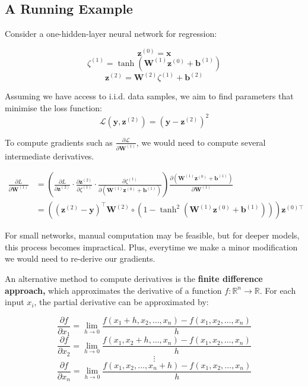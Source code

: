 \subsection{A Running Example}

Consider a one-hidden-layer neural network for regression:

\[
    \bm{z}^{(0)} = \bm{x}
\]
\[
    \zeta^{(1)} = \tanh\left( \bm{W}^{(1)} \bm{z}^{(0)} + \bm{b}^{(1)} \right)
\]
\[
    \bm{z}^{(2)} = \bm{W}^{(2)} \zeta^{(1)} + \bm{b}^{(2)}
\]

Assuming we have access to i.i.d. data samples, we aim to find parameters that minimise the loss function:
\[
    \mathcal{L}(\bm{y}, \bm{z}^{(2)}) = \left( \bm{y} - \bm{z}^{(2)} \right)^2
\]

To compute gradients such as \( \frac{\partial \mathcal{L}}{\partial \bm{W}^{(1)}} \), we would need to compute several intermediate derivatives.

\[\begin{aligned}
        \frac{\partial L}{\partial\boldsymbol{W}^{(1)}} & =\left(\frac{\partial L}{\partial\boldsymbol{z}^{(2)}}\cdot\frac{\partial\boldsymbol{z}^{(2)}}{\partial\zeta^{(1)}}\cdot\frac{\partial\zeta^{(1)}}{\partial(\boldsymbol{W}^{(1)}\boldsymbol{z}^{(0)}+\boldsymbol{b}^{(1)})}\right)\frac{\partial(\boldsymbol{W}^{(1)}\boldsymbol{z}^{(0)}+\boldsymbol{b}^{(1)})}{\partial\boldsymbol{W}^{(1)}} \\
                                                        & =\left((\boldsymbol{z}^{(2)}-\boldsymbol{y})^\top\boldsymbol{W}^{(2)}\circ\left(1-\tanh^2(\boldsymbol{W}^{(1)}\boldsymbol{z}^{(0)}+\boldsymbol{b}^{(1)})\right)\right)\boldsymbol{z}^{(0)\top}
    \end{aligned}\]

For small networks, manual computation may be feasible, but for deeper models, this process becomes impractical. Plus, everytime we make a minor modification we would need to re-derive our gradients. \bigskip

An alternative method to compute derivatives is the\textbf{ finite difference approach,} which approximates the derivative of a function \( f : \mathbb{R}^n \to \mathbb{R} \). For each input \( x_i \), the partial derivative can be approximated by:

\[
    \frac{\partial f}{\partial x_1} = \lim_{h \to 0} \frac{f(x_1 + h, x_2, \dots, x_n) - f(x_1, x_2, \dots, x_n)}{h}
\]
\[
    \frac{\partial f}{\partial x_2} = \lim_{h \to 0} \frac{f(x_1, x_2 + h, \dots, x_n) - f(x_1, x_2, \dots, x_n)}{h}
\]
\[
    \vdots
\]
\[
    \frac{\partial f}{\partial x_n} = \lim_{h \to 0} \frac{f(x_1, x_2, \dots, x_n + h) - f(x_1, x_2, \dots, x_n)}{h}
\]

